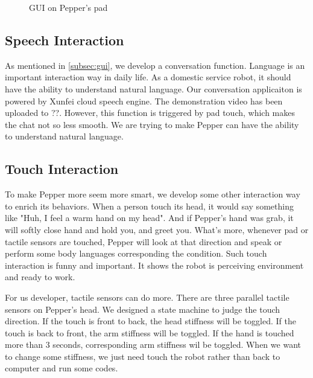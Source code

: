 \begin{figure}[!h]
    \caption{GUI on Pepper's pad}
    
    \label{figb} %
    
    \end{figure}

\subsection{Speech Interaction}
\label{subsec:speech}
As mentioned in \ref{subsec:gui}, we develop a conversation function. 
Language is an important interaction way in daily life.
As a domestic service robot, it should have the ability to understand natural language.
Our conversation applicaiton is powered by Xunfei cloud speech engine.
The demonstration video has been uploaded to ??.
However, this function is triggered by pad touch, which makes the chat not so less smooth.
We are trying to make Pepper can have the ability to understand natural language.

\subsection{Touch Interaction}
\label{subsec:otherinteraction}
To make Pepper more seem more smart, we develop some other interaction way to enrich its behaviors.
When a person touch its head, it would say something like "Huh, I feel a warm hand on my head".
And if Pepper's hand was grab, it will softly close hand and hold you, and greet you.
What's more, whenever pad or tactile sensors are touched, Pepper will look at that direction and speak or perform some body languages corresponding the condition.
Such touch interaction is funny and important.
It shows the robot is perceiving environment and ready to work.

For us developer, tactile sensors can do more.
There are three parallel tactile sensors on Pepper's head.
We designed a state machine to judge the touch direction.
If the touch is front to back, the head stiffness will be toggled.
If the touch is back to front, the arm stiffness will be toggled.
If the hand is touched more than 3 seconds, corresponding arm stiffness wil be toggled.
When we want to change some stiffness, we just need touch the robot rather than back to computer and run some codes.